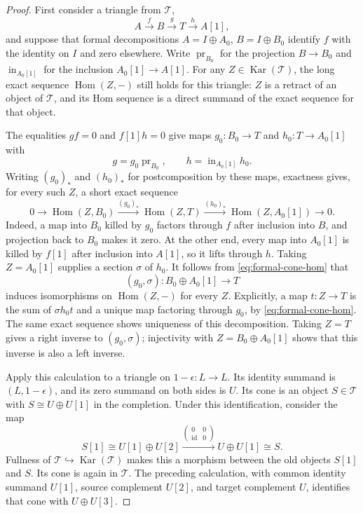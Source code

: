 \documentclass[11pt]{article}
\numberwithin{equation}{section}
\theoremstyle{definition}
\theoremstyle{remark}
\DeclareMathOperator{\Hom}{Hom}
\DeclareMathOperator{\id}{id}
\DeclareMathOperator{\Kar}{Kar}
\begin{document}
\begin{proof}
First consider a triangle from $\mathcal T$,
\[
  A\xrightarrow{f}B\xrightarrow{g}T\xrightarrow{h}A[1],
\]
and suppose that formal decompositions
$A=I\oplus A_0$, $B=I\oplus B_0$ identify $f$ with the identity
on $I$ and zero elsewhere. Write $\operatorname{pr}_{B_0}$ for
the projection $B\to B_0$ and $\operatorname{in}_{A_0[1]}$ for the
inclusion $A_0[1]\to A[1]$. For any $Z\in\Kar(\mathcal T)$,
the long exact sequence $\Hom(Z,-)$ still holds for this triangle:
$Z$ is a retract of an object of $\mathcal T$, and its Hom sequence
is a direct summand of the exact sequence for that object.

The equalities $gf=0$ and $f[1]h=0$ give maps $g_0:B_0\to T$
and $h_0:T\to A_0[1]$ with
\[
  g=g_0\operatorname{pr}_{B_0},\qquad
  h=\operatorname{in}_{A_0[1]}h_0.
\]
Writing $(g_0)_*$ and $(h_0)_*$ for postcomposition by these maps,
exactness gives, for every such $Z$, a short exact sequence
\begin{equation}\label{eq:formal-cone-hom}
  0\longrightarrow\Hom(Z,B_0)
   \xrightarrow{(g_0)_*}\Hom(Z,T)
   \xrightarrow{(h_0)_*}\Hom(Z,A_0[1])
   \longrightarrow0.
\end{equation}
Indeed, a map into $B_0$ killed by $g_0$ factors through $f$ after
inclusion into $B$, and projection back to $B_0$ makes it zero.
At the other end, every map into $A_0[1]$ is killed by $f[1]$ after
inclusion into $A[1]$, so it lifts through $h$.
Taking $Z=A_0[1]$ supplies a section $\sigma$ of $h_0$.
It follows from \eqref{eq:formal-cone-hom} that
\[
  (g_0,\sigma):B_0\oplus A_0[1]\longrightarrow T
\]
induces isomorphisms on $\Hom(Z,-)$ for every $Z$. Explicitly, a map
$t:Z\to T$ is the sum of $\sigma h_0t$ and a unique map factoring
through $g_0$, by \eqref{eq:formal-cone-hom}. The same exact sequence
shows uniqueness of this decomposition. Taking $Z=T$ gives a right
inverse to $(g_0,\sigma)$; injectivity with $Z=B_0\oplus A_0[1]$
shows that this inverse is also a left inverse.

Apply this calculation to a triangle on $1-\epsilon:L\to L$.
Its identity summand is $(L,1-\epsilon)$, and its zero summand on
both sides is $U$.  Its cone is an object $S\in\mathcal T$ with
$S\cong U\oplus U[1]$ in the completion.  Under this identification,
consider the map
\[
  S[1]\cong U[1]\oplus U[2]
     \xrightarrow{\left(\begin{smallmatrix}0&0\\\id&0\end{smallmatrix}\right)}
  U\oplus U[1]\cong S.
\]
Fullness of $\mathcal T\hookrightarrow\Kar(\mathcal T)$ makes
this a morphism between the old objects $S[1]$ and $S$.
Its cone is again in $\mathcal T$.
The preceding calculation, with common identity summand $U[1]$,
source complement $U[2]$, and target complement $U$, identifies
that cone with $U\oplus U[3]$.
\end{proof}
\end{document}
